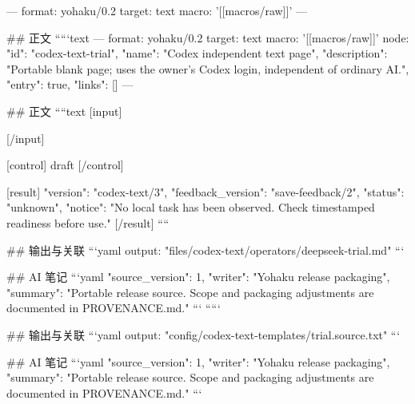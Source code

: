 ---
format: yohaku/0.2
target: text
macro: '[[macros/raw]]'
---

## 正文
`````text
---
format: yohaku/0.2
target: text
macro: '[[macros/raw]]'
node: {"id": "codex-text-trial", "name": "Codex independent text page", "description": "Portable blank page; uses the owner's Codex login, independent of ordinary AI.", "entry": true, "links": []}
---

## 正文
````text
[input]

[/input]

[control]
draft
[/control]

[result]
{
  "version": "codex-text/3",
  "feedback_version": "save-feedback/2",
  "status": "unknown",
  "notice": "No local task has been observed. Check timestamped readiness before use."
}
[/result]
````

## 输出与关联
```yaml
output: "files/codex-text/operators/deepseek-trial.md"
```

## AI 笔记
```yaml
{"source_version": 1, "writer": "Yohaku release packaging", "summary": "Portable release source. Scope and packaging adjustments are documented in PROVENANCE.md."}
```
`````

## 输出与关联
```yaml
output: "config/codex-text-templates/trial.source.txt"
```

## AI 笔记
```yaml
{"source_version": 1, "writer": "Yohaku release packaging", "summary": "Portable release source. Scope and packaging adjustments are documented in PROVENANCE.md."}
```

